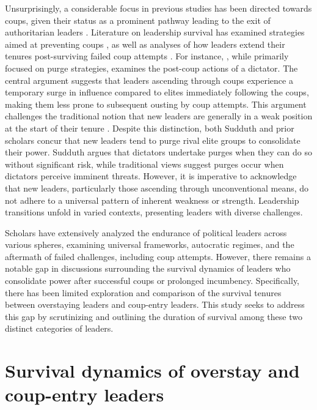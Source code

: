 \documentclass[
  12pt,
  a4paper,
  12pt]{article}
\begin{document}
Unsurprisingly, a considerable focus in previous studies has been
directed towards coups, given their status as a prominent pathway
leading to the exit of authoritarian leaders
\citep{svolik2008, frantz2016}. Literature on leadership survival has
examined strategies aimed at preventing coups
\citep{powell2017, sudduth2017, debruin2020}, as well as analyses of how
leaders extend their tenures post-surviving failed coup attempts
\citep{easton2018}. For instance, \citet{sudduth2017a}, while primarily
focused on purge strategies, examines the post-coup actions of a
dictator. The central argument suggests that leaders ascending through
coups experience a temporary surge in influence compared to elites
immediately following the coups, making them less prone to subsequent
ousting by coup attempts. This argument challenges the traditional
notion that new leaders are generally in a weak position at the start of
their tenure \citep{roessler2011}. Despite this distinction, both
Sudduth and prior scholars concur that new leaders tend to purge rival
elite groups to consolidate their power. Sudduth argues that dictators
undertake purges when they can do so without significant risk, while
traditional views suggest purges occur when dictators perceive imminent
threats. However, it is imperative to acknowledge that new leaders,
particularly those ascending through unconventional means, do not adhere
to a universal pattern of inherent weakness or strength. Leadership
transitions unfold in varied contexts, presenting leaders with diverse
challenges.

Scholars have extensively analyzed the endurance of political leaders
across various spheres, examining universal frameworks, autocratic
regimes, and the aftermath of failed challenges, including coup
attempts. However, there remains a notable gap in discussions
surrounding the survival dynamics of leaders who consolidate power after
successful coups or prolonged incumbency. Specifically, there has been
limited exploration and comparison of the survival tenures between
overstaying leaders and coup-entry leaders. This study seeks to address
this gap by scrutinizing and outlining the duration of survival among
these two distinct categories of leaders.

\newpage

\section{Survival dynamics of overstay and coup-entry
leaders}\label{survival-dynamics-of-overstay-and-coup-entry-leaders}
\end{document}
